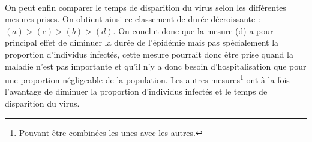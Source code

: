 \documentclass[a4paper, 12pt, oneside]{article}
\begin{document}
\paragraph{} On peut enfin comparer le temps de disparition du virus selon les différentes mesures prises. On obtient ainsi ce classement de durée décroissante : $(a) > (c) > (b) > (d)$. On conclut donc que la mesure (d) a pour principal effet de diminuer la durée de l'épidémie mais pas spécialement la proportion d'individus infectés, cette mesure pourrait donc être prise quand la maladie n'est pas importante et qu'il n'y a donc besoin d'hospitalisation que pour une proportion négligeable de la population. Les autres mesures\footnote{Pouvant être combinées les unes avec les autres.} ont à la fois l'avantage de diminuer la proportion d'individus infectés et le temps de disparition du virus.
\end{document}
